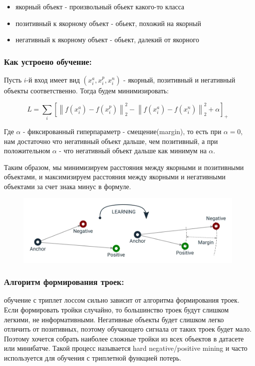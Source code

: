 \begin{itemize}
    \item якорный объект - произвольный обьект какого-то класса
    \item позитивный к якорному объект - обьект, похожий на якорный
    \item негативный к якорному объект - обьект, далекий от якорного
\end{itemize}

\subsubsection*{Как устроено обучение:}

Пусть $i$-й вход имеет вид $(x_i^a, x_i^p, x_i^n)$ - якорный, позитивный и негативный объекты соответственно. Тогда будем минимизировать:

$$L = \sum\limits_i \left[\left \lVert f(x_i^a) - f(x_i^p) \right \rVert_2^2 - \left \lVert f(x_i^a) - f(x_i^n) \right \rVert_2^2 + \alpha \right]_+$$

Где $\alpha$ - фиксированный гиперпараметр - смещение(margin), то есть при $\alpha = 0$, нам достаточно что негативный объект дальше, чем позитивный,
а при положительном $\alpha$ - что негативный объект дальше как минимум на $\alpha$.

Таким образом, мы минимизируем расстояния между якорными и позитивными объектами,
и максимизируем расстояния между якорными и негативными объектами за счет знака минус в формуле.

\begin{figure}[h]
    \centering
    \includegraphics[scale=0.5]{chapters/nonstandart_error/images/triplet_loss_learning.png}
\end{figure}

\subsubsection*{Алгоритм формирования троек:}

обучение с триплет лоссом сильно зависит от алгоритма формирования троек.
Если формировать тройки случайно, то большинство троек будут слишком легкими, не информативными.
Негативные объекты будет слишком легко отличить от позитивных, поэтому обучающего сигнала от таких троек будет мало.
Поэтому хочется собрать наиболее сложные тройки из всех объектов в датасете или минибатче.
Такой процесс называется hard negative/positive mining и часто используется для обучения с триплетной функцией потерь.

